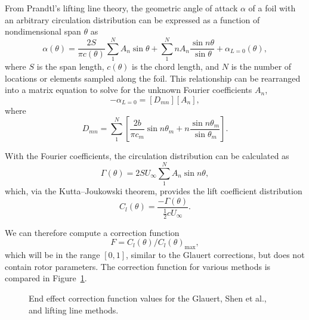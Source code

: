 From Prandtl's lifting line theory, the geometric angle of attack $\alpha$ of a
foil with an arbitrary circulation distribution can be expressed as a function
of nondimensional span $\theta$ as \cite{Anderson2001}
\begin{equation}
    \alpha (\theta) = \frac{2S}{\pi c (\theta)}
    \sum_1^N A_n \sin \theta
    + \sum_1^N n A_n \frac{\sin n \theta}{\sin \theta}
    + \alpha_{L = 0}(\theta),
    \label{eq:lifting-line}
\end{equation}
where $S$ is the span length, $c(\theta)$ is the chord length, and $N$ is the
number of locations or elements sampled along the foil. This relationship can be
rearranged into a matrix equation to solve for the unknown Fourier coefficients
$A_n$,
\begin{equation}
    [\alpha_m ] - \alpha_{L=0} = [D_{mn}][A_n],
\end{equation}
where
\begin{equation}
    D_{mn} = \sum_1^N \left[ \frac{2b}{\pi c_m} \sin n \theta_m + n \frac{\sin n
        \theta_m}{\sin \theta_m} \right].
\end{equation}

With the Fourier coefficients, the circulation distribution can be calculated as
\begin{equation}
    \Gamma (\theta) = 2SU_\infty \sum_1^N A_n \sin n \theta,
\end{equation}
which, via the Kutta--Joukowski theorem, provides the lift coefficient
distribution
\begin{equation}
    C_l(\theta) = \frac{-\Gamma (\theta)}{\frac{1}{2} c U_\infty}.
\end{equation}

We can therefore compute a correction function 
\begin{equation}
    F = C_l(\theta)/C_l(\theta)_{\max},
\end{equation}
which will be in the range $[0, 1]$, similar to the Glauert corrections, but
does not contain rotor parameters. The correction function for various methods
is compared in Figure~\ref{fig:end-effects}.

\begin{figure}
    \centering
    
    \caption{End effect correction function values for the Glauert, Shen et al.,
        and lifting line methods.}
    
    \label{fig:end-effects}
\end{figure}




